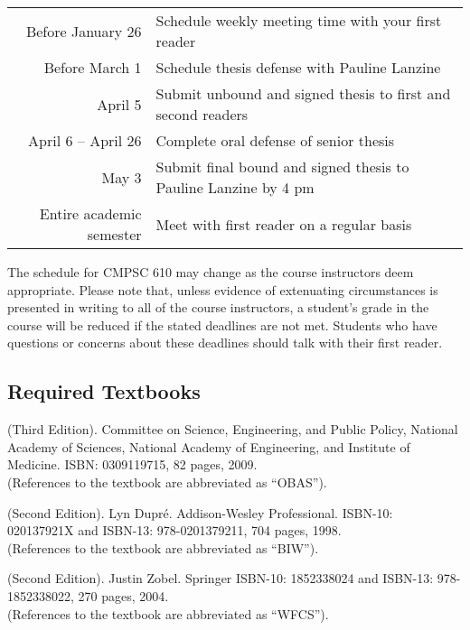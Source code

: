 \begin{center}
\begin{tabular}{r|l}
\hline
Before January 26 & Schedule weekly meeting time with your first reader \\
Before March 1 & Schedule thesis defense with Pauline Lanzine \\
April 5 & Submit unbound and signed thesis to first and second readers \\
April 6 -- April 26 & Complete oral defense of senior thesis \\
May 3 & Submit final bound and signed thesis to Pauline Lanzine by 4 pm\\
\hline
Entire academic semester & Meet with first reader on a regular basis \\
\hline
\end{tabular}
\end{center}

\noindent The schedule for CMPSC 610 may change as the course instructors deem appropriate. Please note that, unless
evidence of extenuating circumstances is presented in writing to all of the course instructors, a student's grade in the
course will be reduced if the stated deadlines are not met. Students who have questions or concerns about these
deadlines should talk with their first reader.

\vspace{-.15in}
\subsection*{Required Textbooks}
\vspace{-.05in}

 (Third Edition).  Committee on Science,
Engineering, and Public Policy, National Academy of Sciences, National Academy of Engineering, and Institute of
Medicine. ISBN: 0309119715, 82 pages, 2009.\\ (References to the textbook are abbreviated as ``OBAS'').

 (Second Edition). Lyn Dupr\'e.  Addison-Wesley
Professional.  ISBN-10: 020137921X and ISBN-13: 978-0201379211, 704 pages, 1998.\\ (References to the textbook are
abbreviated as ``BIW'').

 (Second Edition).  Justin Zobel.  Springer ISBN-10: 1852338024 and ISBN-13:
978-1852338022, 270 pages, 2004. \\ (References to the textbook are abbreviated as ``WFCS'').

